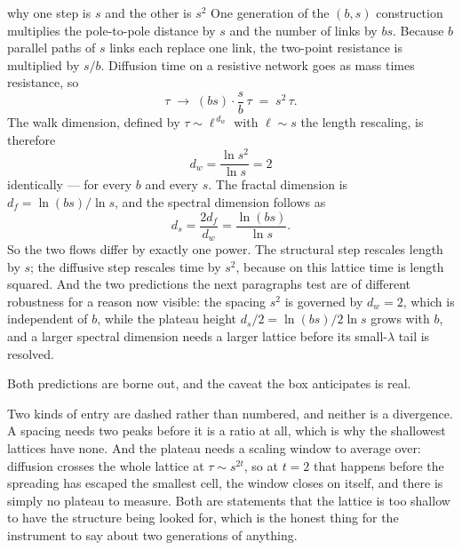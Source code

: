 \begin{calculation}{why one step is $s$ and the other is $s^{2}$}
One generation of the $(b,s)$ construction multiplies the pole-to-pole distance by
$s$ and the number of links by $bs$. Because $b$ parallel paths of $s$ links each
replace one link, the two-point resistance is multiplied by $s/b$. Diffusion time on
a resistive network goes as mass times resistance, so
\begin{equation}
  \tau \;\longrightarrow\; (bs)\cdot\frac{s}{b}\,\tau \;=\; s^{2}\,\tau .
  \label{eq:hc-tau-step}
\end{equation}
The walk dimension, defined by $\tau\sim \ell^{\,d_w}$ with $\ell\sim s$ the length
rescaling, is therefore
\begin{equation}
  d_w = \frac{\ln s^{2}}{\ln s} = 2
  \label{eq:hc-dw}
\end{equation}
identically --- for every $b$ and every $s$. The fractal dimension is
$d_f=\ln(bs)/\ln s$, and the spectral dimension follows as
\begin{equation}
  d_s = \frac{2 d_f}{d_w} = \frac{\ln(bs)}{\ln s} .
  \label{eq:hc-ds}
\end{equation}
So the two flows differ by exactly one power. The structural step rescales length by
$s$; the diffusive step rescales time by $s^{2}$, because on this lattice time is
length squared. And the two predictions the next paragraphs test are of different
robustness for a reason now visible: the spacing $s^{2}$ is governed by $d_w=2$,
which is independent of $b$, while the plateau height $d_s/2=\ln(bs)/2\ln s$ grows
with $b$, and a larger spectral dimension needs a larger lattice before its
small-$\lambda$ tail is resolved.
\end{calculation}

Both predictions are borne out, and the caveat the box anticipates is real.



\noindent Two kinds of entry are dashed rather than numbered, and neither is a
divergence. A spacing needs two peaks before it is a ratio at all, which is why the
shallowest lattices have none. And the plateau needs a scaling window to average over:
diffusion crosses the whole lattice at $\tau\sim s^{2t}$, so at $t=2$ that happens
before the spreading has escaped the smallest cell, the window closes on itself, and
there is simply no plateau to measure. Both are statements that the lattice is too
shallow to have the structure being looked for, which is the honest thing for the
instrument to say about two generations of anything.

